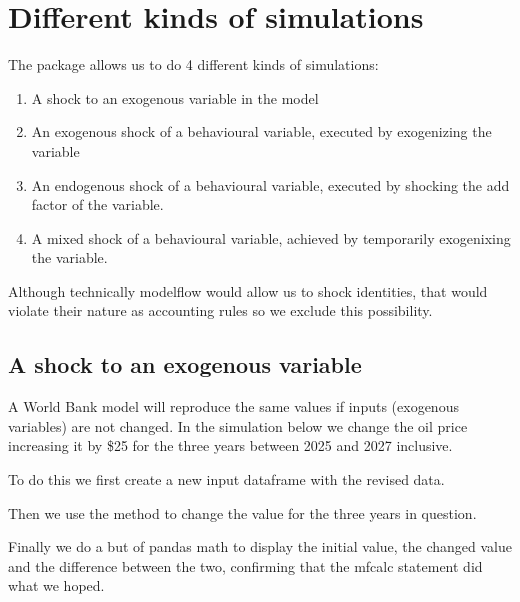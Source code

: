 \documentclass[letterpaper,10pt,english]{jupyterBook}
\begin{document}
\section{Different kinds of simulations}
\label{\detokenize{content/06_WBModels/LoadingWBModel:different-kinds-of-simulations}}
\sphinxAtStartPar
The  package allows us to do 4 different kinds of simulations:
\begin{enumerate}
%
\item {} 
\sphinxAtStartPar
A shock to an exogenous variable in the model

\item {} 
\sphinxAtStartPar
An exogenous shock of a behavioural variable, executed by exogenizing the variable

\item {} 
\sphinxAtStartPar
An endogenous shock of a behavioural variable, executed by shocking the add factor of the variable.

\item {} 
\sphinxAtStartPar
A mixed shock of a behavioural variable, achieved by temporarily exogenixing the variable.

\end{enumerate}

\sphinxAtStartPar
Although technically modelflow would allow us to shock identities, that would violate their nature as accounting rules so we exclude this possibility.


\subsection{A shock to an exogenous variable}
\label{\detokenize{content/06_WBModels/LoadingWBModel:a-shock-to-an-exogenous-variable}}
\sphinxAtStartPar
A World Bank model will reproduce the same values if inputs (exogenous variables) are not changed.  In the simulation below we change the oil price increasing it by \$25 for the three years between 2025 and 2027 inclusive.

\sphinxAtStartPar
To do this we first create a new input dataframe with the revised data.

\sphinxAtStartPar
Then we use the  method to change the value for the three years in question.

\sphinxAtStartPar
Finally we do a but of pandas math to display the initial value, the changed value and the difference between the two, confirming that the mfcalc statement did what we hoped.
\end{document}
